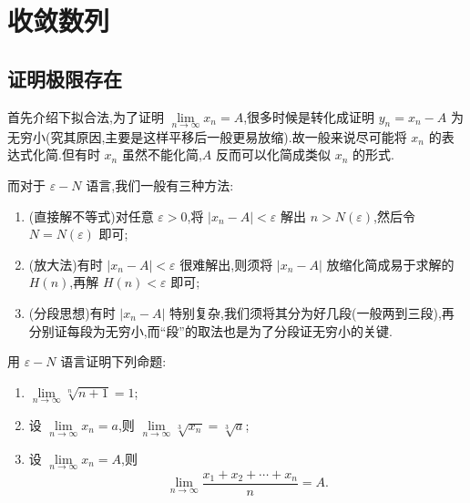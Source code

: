 \newpage

\section{收敛数列}


\subsection{证明极限存在}



首先介绍下拟合法,为了证明 $\displaystyle \lim\limits_{n\to\infty}x_n=A$,很多时候是转化成证明
$y_n=x_n-A$ 为无穷小(究其原因,主要是这样平移后一般更易放缩).故一般来说尽可能将
$x_n$ 的表达式化简.但有时 $x_n$ 虽然不能化简,$A$ 反而可以化简成类似 $x_n$ 的形式.

而对于 $\varepsilon-N$ 语言,我们一般有三种方法:

\begin{enumerate}
  \item (直接解不等式)对任意 $\varepsilon>0$,将 $|x_n-A|<\varepsilon$ 解出
        $n>N(\varepsilon)$,然后令 $N=N(\varepsilon)$ 即可;
  \item (放大法)有时 $|x_n-A|<\varepsilon$ 很难解出,则须将 $|x_n-A|$ 放缩化简成易于求解的
        $H(n)$,再解 $H(n)<\varepsilon$ 即可;
  \item (分段思想)有时 $|x_n-A|$ 特别复杂,我们须将其分为好几段(一般两到三段),再分别证每段为无穷小,而``段''的取法也是为了分段证无穷小的关键.
\end{enumerate}

\begin{example}
  用 $\varepsilon-N$ 语言证明下列命题:
  \begin{enumerate}
    \item $\displaystyle \lim\limits_{n\to\infty}\sqrt[n]{n+1}=1$;
    \item 设 $\displaystyle \lim\limits_{n\to\infty}x_n=a$,则
          $\displaystyle \lim\limits_{n\to\infty}\sqrt[3]{x_n}=\sqrt[3]{a}$;
    \item 设 $\displaystyle \lim\limits_{n\to\infty}x_n=A$,则
          \[
            \displaystyle\lim\limits_{n\to\infty}\dfrac{x_1+x_2+\cdots+x_n}{n}=A.
          \]
  \end{enumerate}
\end{example}
\exampleblank

